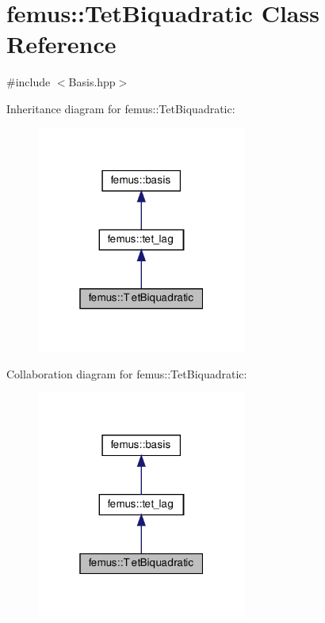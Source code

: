 \hypertarget{classfemus_1_1_tet_biquadratic}{}\section{femus\+:\+:Tet\+Biquadratic Class Reference}
\label{classfemus_1_1_tet_biquadratic}


{\ttfamily \#include $<$Basis.\+hpp$>$}



Inheritance diagram for femus\+:\+:Tet\+Biquadratic\+:
\nopagebreak
\begin{figure}[H]
\begin{center}
\leavevmode
\includegraphics[width=196pt]{classfemus_1_1_tet_biquadratic__inherit__graph}
\end{center}
\end{figure}


Collaboration diagram for femus\+:\+:Tet\+Biquadratic\+:
\nopagebreak
\begin{figure}[H]
\begin{center}
\leavevmode
\includegraphics[width=196pt]{classfemus_1_1_tet_biquadratic__coll__graph}
\end{center}
\end{figure}
